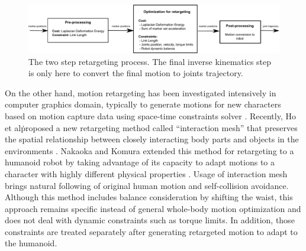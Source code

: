 \documentclass[letterpaper, 10 pt, conference]{ieeeconf}  %
\begin{document}
%

\begin{figure}[b]
  \includegraphics[width=\linewidth]{figure/architecture.pdf}
  \caption{The two step retargeting process. The final inverse
    kinematics step is only here to convert the final motion to joints
    trajectory.}
  \label{fig:algorithm}
\end{figure}


On the other hand, motion retargeting has been investigated
intensively in computer graphics domain, typically to generate motions
for new characters based on motion capture data using space-time
constraints solver \cite{Gleicher98}.  Recently, Ho et al\. proposed a
new retargeting method called ``interaction mesh'' that preserves the
spatial relationship between closely interacting body parts and
objects in the environments \cite{Komura10}.  Nakaoka and Komura
extended this method for retargeting to a humanoid robot by taking
advantage of its capacity to adapt motions to a character with highly
different physical properties \cite{Nakaoka12Humanoids}. Usage of
interaction mesh brings natural following of original human motion and
self-collision avoidance.  Although this method includes 
balance consideration by shifting the waist, this approach remains
specific instead of general whole-body motion optimization and 
does not deal with dynamic constraints such as torque limits. 
In addition, those constraints are treated separately after
generating retargeted motion to adapt to the humanoid.
\end{document}
